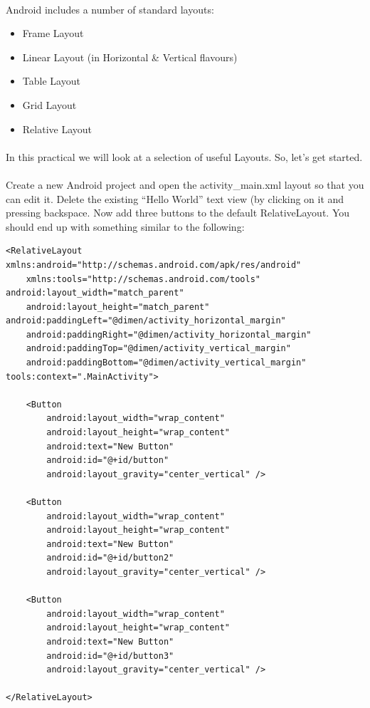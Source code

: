 \documentclass[12pt, a4paper, twoside]{book}
\begin{document}
\paragraph{} Android includes a number of standard layouts:

\begin{itemize}
\item Frame Layout
\item Linear Layout (in Horizontal \& Vertical flavours)
\item Table Layout
\item Grid Layout
\item Relative Layout
\end{itemize}

\paragraph{} In this practical we will look at a selection of useful Layouts. So, let's get started.

\paragraph{} Create a new Android project and open the activity\_main.xml layout so that you can edit it. Delete the existing ``Hello World'' text view (by clicking on it and pressing backspace. Now add three buttons to the default RelativeLayout. You should end up with something similar to the following:

\begin{lstlisting}
<RelativeLayout xmlns:android="http://schemas.android.com/apk/res/android"
    xmlns:tools="http://schemas.android.com/tools" android:layout_width="match_parent"
    android:layout_height="match_parent" android:paddingLeft="@dimen/activity_horizontal_margin"
    android:paddingRight="@dimen/activity_horizontal_margin"
    android:paddingTop="@dimen/activity_vertical_margin"
    android:paddingBottom="@dimen/activity_vertical_margin" tools:context=".MainActivity">

    <Button
        android:layout_width="wrap_content"
        android:layout_height="wrap_content"
        android:text="New Button"
        android:id="@+id/button"
        android:layout_gravity="center_vertical" />

    <Button
        android:layout_width="wrap_content"
        android:layout_height="wrap_content"
        android:text="New Button"
        android:id="@+id/button2"
        android:layout_gravity="center_vertical" />

    <Button
        android:layout_width="wrap_content"
        android:layout_height="wrap_content"
        android:text="New Button"
        android:id="@+id/button3"
        android:layout_gravity="center_vertical" />

</RelativeLayout>
\end{lstlisting}
\end{document}
